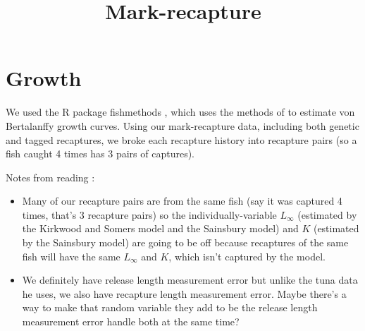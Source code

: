 \documentclass[12pt, oneside]{article}   	%
\title{Mark-recapture}
\begin{document}
\date{}
\maketitle{}

\section*{Growth}
We used the R package fishmethods \citep{nelson2018fishmethods}, which uses the methods of \cite{hampton1991estimation} to estimate von Bertalanffy growth curves. Using our mark-recapture data, including both genetic and tagged recaptures, we broke each recapture history into recapture pairs (so a fish caught 4 times has 3 pairs of captures).

Notes from reading \citep{hampton1991estimation}:
\begin{itemize}
	\item Many of our recapture pairs are from the same fish (say it was captured 4 times, that's 3 recapture pairs) so the individually-variable $L_{\infty}$ (estimated by the Kirkwood and Somers model and the Sainsbury model) and $K$ (estimated by the Sainsbury model) are going to be off because recaptures of the same fish will have the same $L_\infty$ and $K$, which isn't captured by the model.
	\item We definitely have release length measurement error but unlike the tuna data he uses, we also have recapture length measurement error. Maybe there's a way to make that random variable they add to be the release length measurement error handle both at the same time?
\end{itemize}
\end{document}
